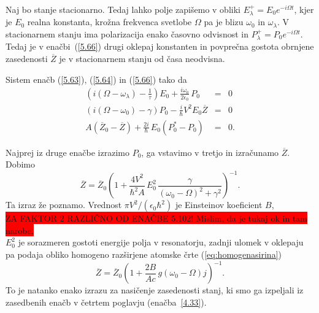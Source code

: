 Naj bo stanje stacionarno. Tedaj lahko polje zapišemo v obliki $E_{\lambda
}^{+}=E_{0}e^{-i\Omega t}$, kjer je $E_{0}$ realna konstanta, krožna frekvenca
svetlobe $\Omega$ pa je blizu $\omega _{0}$ in $\omega _{\lambda }$. V
stacionarnem stanju ima polarizacija enako časovno odvisnost in 
$P_{\lambda }^{+}=P_{0}e^{-i\Omega t}$. Tedaj je v enačbi~(\ref{5.66}) drugi
oklepaj konstanten in povprečna gostota obrnjene zasedenosti $\overline{Z}$ je 
v stacionarnem stanju od časa neodvisna. 

Sistem enačb (\ref{5.63}), (\ref{5.64}) in (\ref{5.66}) 
tako da 
\begin{eqnarray}
\left(i\left(\Omega - \omega_{\lambda}\right)-\frac{1}{\tau}\right) E_{0}+\frac{i\omega _{0}}
{2\epsilon _{0}}\,P_{0} &=&0  \label{5.67} \\
\left(i\left(\Omega-\omega_{0}\right)-\gamma\right)P_{0}-\frac{i}{\hbar}V^{2}
E_{0}\overline{Z} &=&0 \label{5.67b}\\
A\left(\overline{Z}_{0}-\overline{Z}\right)+\frac{2i}{\hbar }\,E_{0}\left(P_{0}^{*}-P_{0}\right) &=&0.
\end{eqnarray}

Najprej iz druge enačbe izrazimo $P_0$, ga vstavimo v tretjo in izračunamo $\overline{Z}$. Dobimo
\begin{equation}  
\label{5.68}
\overline{Z}=\overline{Z}_0\left(1+\frac{4V^2}{\hbar^2 A}\,E_0^2\, \frac{\gamma}
{\left(\omega_0-\Omega\right)^2+\gamma^2}\right)^{-1}.
\end{equation}
Ta izraz že poznamo. Vrednost $\pi V^2/\left(\epsilon_0\hbar^2\right)$ je Einsteinov
koeficient $B$,\\
\colorbox{red}{ZA FAKTOR 2 RAZLIČNO OD ENAČBE 5.102! Mislim, da je tukaj ok in tam narobe.}\\
$E_0^2$ je sorazmeren gostoti energije polja v resonatorju,
zadnji ulomek v oklepaju pa podaja obliko homogeno razširjene atomske
črte (\ref{eq:homogenasirina})
\begin{equation}  
\label{5.69}
\overline{Z}=\overline{Z}_0\left(1+\frac{2B}{Ac}\,g\left(\omega_0- \Omega\right)j\right)^{-1}.
\end{equation}
To je natanko enako izrazu za nasičenje zasedenosti stanj, ki smo ga
izpeljali iz zasedbenih enačb v četrtem poglavju (enačba~\ref{4.33}).

